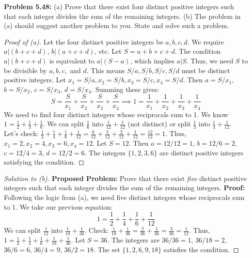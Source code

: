 \documentclass[11pt, a4paper]{article}
\theoremstyle{definition}
\theoremstyle{remark}
\begin{document}
\textbf{Problem 5.48:} 
(a) Prove that there exist four distinct positive integers such that each integer divides the sum of the remaining integers.
(b) The problem in (a) should suggest another problem to you. State and solve such a problem.
\begin{proof}[Proof of (a)]
    Let the four distinct positive integers be $a, b, c, d$. We require $a | (b+c+d)$, $b | (a+c+d)$, etc. 
    Let $S = a+b+c+d$. The condition $a | (b+c+d)$ is equivalent to $a | (S-a)$, which implies $a | S$. Thus, we need $S$ to be divisible by $a, b, c,$ and $d$.
    This means $S/a, S/b, S/c, S/d$ must be distinct positive integers. Let $x_1 = S/a, x_2 = S/b, x_3 = S/c, x_4 = S/d$. 
    Then $a = S/x_1$, $b = S/x_2$, $c = S/x_3$, $d = S/x_4$. 
    Summing these gives:
    \[ S = \frac{S}{x_1} + \frac{S}{x_2} + \frac{S}{x_3} + \frac{S}{x_4} \implies 1 = \frac{1}{x_1} + \frac{1}{x_2} + \frac{1}{x_3} + \frac{1}{x_4} \]
    We need to find four distinct integers whose reciprocals sum to 1. We know $1 = \frac{1}{2} + \frac{1}{3} + \frac{1}{6}$. We can split $\frac{1}{6}$ into $\frac{1}{12} + \frac{1}{12}$ (not distinct) or split $\frac{1}{3}$ into $\frac{1}{4} + \frac{1}{12}$. 
    Let's check: $\frac{1}{2} + \frac{1}{4} + \frac{1}{6} + \frac{1}{12} = \frac{6}{12} + \frac{3}{12} + \frac{2}{12} + \frac{1}{12} = \frac{12}{12} = 1$.
    Thus, $x_1=2, x_2=4, x_3=6, x_4=12$. 
    Let $S = 12$. Then $a = 12/12 = 1$, $b = 12/6 = 2$, $c = 12/4 = 3$, $d = 12/2 = 6$. 
    The integers $\{1, 2, 3, 6\}$ are distinct positive integers satisfying the condition.
\end{proof}
\begin{proof}[Solution to (b)]
    \textbf{Proposed Problem:} Prove that there exist \textit{five} distinct positive integers such that each integer divides the sum of the remaining integers.
    \textbf{Proof:} Following the logic from (a), we need five distinct integers whose reciprocals sum to 1. We take our previous equation:
    \[ 1 = \frac{1}{2} + \frac{1}{4} + \frac{1}{6} + \frac{1}{12} \]
    We can split $\frac{1}{12}$ into $\frac{1}{18} + \frac{1}{36}$. 
    Check: $\frac{1}{18} + \frac{1}{36} = \frac{2}{36} + \frac{1}{36} = \frac{3}{36} = \frac{1}{12}$.
    Thus, $1 = \frac{1}{2} + \frac{1}{4} + \frac{1}{6} + \frac{1}{18} + \frac{1}{36}$.
    Let $S = 36$. The integers are $36/36 = 1$, $36/18 = 2$, $36/6 = 6$, $36/4 = 9$, $36/2 = 18$.
    The set $\{1, 2, 6, 9, 18\}$ satisfies the condition.
\end{proof}
\end{document}
